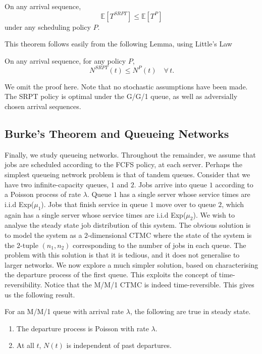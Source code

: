 \documentclass[12pt]{article}
\def\E{\mathbb{E}}
\theoremstyle{definition}
\begin{document}
\begin{thm}
    On any arrival sequence,
    \[
        \E\left[ T^{SRPT} \right] \leq \E\left[ T^P \right]
    \]
    under any scheduling policy $P$.
\end{thm}
This theorem follows easily from the following Lemma, using Little's Law

\begin{lem}
    On any arrival sequence, for any policy $P$,
    \[
        N^{SRPT}(t) \leq N^P(t) \quad \forall \, t.
    \]
\end{lem}

We omit the proof here. Note that no stochastic assumptions have been made. The SRPT policy is optimal under the G/G/1 queue, as well as adversially chosen arrival sequences.

\subsection{Burke's Theorem and Queueing Networks}

Finally, we study queueing networks. Throughout the remainder, we assume that jobs are scheduled according to the FCFS policy, at each server. Perhaps the simplest queueing network problem is that of tandem queues. Consider that we have two infinite-capacity queues, $1$ and $2$. Jobs arrive into queue $1$ according to a Poisson process of rate $\lambda$. Queue $1$ has a single server whose service times are i.i.d Exp($\mu_1$). Jobs that finish service in queue $1$ move over to queue $2$, which again has a single server whose service times are i.i.d Exp($\mu_2$). We wish to analyse the steady state job distribution  of this system. The obvious solution is to model the system as a $2$-dimensional CTMC where the state of the system is the $2$-tuple $(n_1, n_2)$ corresponding to the number of jobs in each queue. The problem with this solution is that it is tedious, and it does not generalise to larger networks. We now explore a much simpler solution, based on characterising the departure process of the first queue. This exploits the concept of time-reversibility. Notice that the M/M/1 CTMC is indeed time-reversible. This gives us the following result.

\begin{thm}
    For an M/M/1 queue with arrival rate $\lambda$, the following are true in steady state.
    \begin{enumerate}
        \item The departure process is Poisson with rate $\lambda$.
        \item At all $t$, $N(t)$ is independent of past departures.
    \end{enumerate}
\end{thm}
\end{document}
